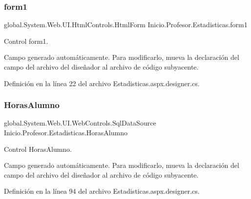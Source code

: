 \mbox{\label{classInicio_1_1Profesor_1_1Estadisticas_a1bdfaf6ebbcf378fff4819745a873b25}} 
\subsubsection{\texorpdfstring{form1}{form1}}
{\footnotesize\ttfamily global.\+System.\+Web.\+U\+I.\+Html\+Controls.\+Html\+Form Inicio.\+Profesor.\+Estadisticas.\+form1\hspace{0.3cm}{\ttfamily [protected]}}



Control form1. 

Campo generado automáticamente. Para modificarlo, mueva la declaración del campo del archivo del diseñador al archivo de código subyacente. 

Definición en la línea 22 del archivo Estadisticas.\+aspx.\+designer.\+cs.

\mbox{\label{classInicio_1_1Profesor_1_1Estadisticas_a6f9687e52da02e70a125116ade7cd0f1}} 
\subsubsection{\texorpdfstring{HorasAlumno}{HorasAlumno}}
{\footnotesize\ttfamily global.\+System.\+Web.\+U\+I.\+Web\+Controls.\+Sql\+Data\+Source Inicio.\+Profesor.\+Estadisticas.\+Horas\+Alumno\hspace{0.3cm}{\ttfamily [protected]}}



Control Horas\+Alumno. 

Campo generado automáticamente. Para modificarlo, mueva la declaración del campo del archivo del diseñador al archivo de código subyacente. 

Definición en la línea 94 del archivo Estadisticas.\+aspx.\+designer.\+cs.

\mbox{\label{classInicio_1_1Profesor_1_1Estadisticas_a09dc4adf28f35d11a3a0dece04617209}} 
